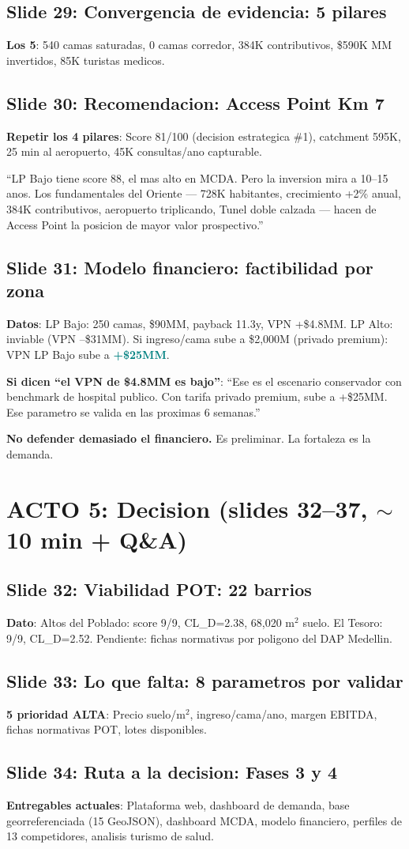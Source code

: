 \documentclass[10pt, a4paper]{article}
\newcommand{\hl}[1]{\textcolor{teal}{\textbf{#1}}}
\newcommand{\slide}[2]{\subsection{Slide #1: #2}}
\begin{document}
\slide{29}{Convergencia de evidencia: 5 pilares}
\textbf{Los 5}: 540 camas saturadas, 0 camas corredor, 384K contributivos, \$590K MM invertidos, 85K turistas medicos.

\slide{30}{Recomendacion: Access Point Km 7}
\textbf{Repetir los 4 pilares}: Score 81/100 (decision estrategica \#1), catchment 595K, 25 min al aeropuerto, 45K consultas/ano capturable.

\begin{cita}
``LP Bajo tiene score 88, el mas alto en MCDA. Pero la inversion mira a 10--15 anos. Los fundamentales del Oriente --- 728K habitantes, crecimiento +2\% anual, 384K contributivos, aeropuerto triplicando, Tunel doble calzada --- hacen de Access Point la posicion de mayor valor prospectivo.''
\end{cita}

\slide{31}{Modelo financiero: factibilidad por zona}
\textbf{Datos}: LP Bajo: 250 camas, \$90MM, payback 11.3y, VPN +\$4.8MM. LP Alto: inviable (VPN --\$31MM). Si ingreso/cama sube a \$2,000M (privado premium): VPN LP Bajo sube a \hl{+\$25MM}.

\begin{alerta}
\textbf{Si dicen ``el VPN de \$4.8MM es bajo''}: ``Ese es el escenario conservador con benchmark de hospital publico. Con tarifa privado premium, sube a +\$25MM. Ese parametro se valida en las proximas 6 semanas.''

\vspace{2pt}
\textbf{No defender demasiado el financiero.} Es preliminar. La fortaleza es la demanda.
\end{alerta}

\section{ACTO 5: Decision (slides 32--37, $\sim$10 min + Q\&A)}

\slide{32}{Viabilidad POT: 22 barrios}
\textbf{Dato}: Altos del Poblado: score 9/9, CL\_D=2.38, 68,020 m$^2$ suelo. El Tesoro: 9/9, CL\_D=2.52. Pendiente: fichas normativas por poligono del DAP Medellin.

\slide{33}{Lo que falta: 8 parametros por validar}
\textbf{5 prioridad ALTA}: Precio suelo/m$^2$, ingreso/cama/ano, margen EBITDA, fichas normativas POT, lotes disponibles.

\slide{34}{Ruta a la decision: Fases 3 y 4}
\textbf{Entregables actuales}: Plataforma web, dashboard de demanda, base georreferenciada (15 GeoJSON), dashboard MCDA, modelo financiero, perfiles de 13 competidores, analisis turismo de salud.
\end{document}
